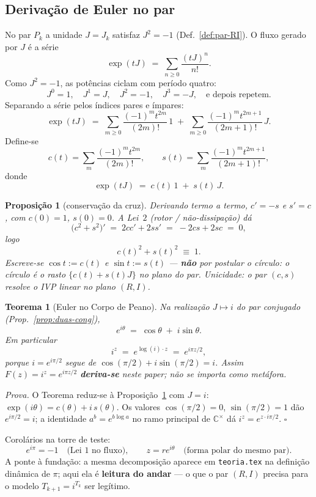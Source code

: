 \documentclass[11pt,a4paper]{article}
\newtheorem{teorema}{Teorema}
\newtheorem{proposicao}{Proposição}
\newcommand{\code}[1]{\texttt{#1}}
\begin{document}
\subsection*{Derivação de Euler no par}\label{sec:euler-peano}

No par $P_k$ a unidade $J=J_k$ satisfaz $J^{2}=-1$
(Def.~\ref{def:par-RI}). O fluxo gerado por $J$ é a série
\[
\boxed{
\exp(tJ)
\;=\;
\sum_{n\geq0}\frac{(tJ)^{n}}{n!}.
}
\]
Como $J^{2}=-1$, as potências ciclam com período quatro:
\[
\boxed{
J^{0}=1,\quad
J^{1}=J,\quad
J^{2}=-1,\quad
J^{3}=-J,
\quad\text{e depois repetem}.
}
\]
Separando a série pelos índices pares e ímpares:
\[
\exp(tJ)
\;=\;
\sum_{m\geq0}\frac{(-1)^{m}t^{2m}}{(2m)!}\,1
\;+\;
\sum_{m\geq0}\frac{(-1)^{m}t^{2m+1}}{(2m+1)!}\,J.
\]
Define-se
\[
\boxed{
c(t)=\sum_{m}\frac{(-1)^{m}t^{2m}}{(2m)!},
\qquad
s(t)=\sum_{m}\frac{(-1)^{m}t^{2m+1}}{(2m+1)!},
}
\]
donde
\[
\boxed{\exp(tJ) \;=\; c(t)\,1 \;+\; s(t)\,J}.
\]

\begin{proposicao}[conservação da cruz]\label{prop:euler-cruz}
Derivando termo a termo, $c'=-s$ e $s'=c$, com $c(0)=1$, $s(0)=0$.
A Lei~$2$ (rotor / não-dissipação) dá
\[
\bigl(c^{2}+s^{2}\bigr)'
\;=\;
2cc'+2ss'
\;=\;
-2cs+2sc
\;=\;
0,
\]
logo
\[
\boxed{c(t)^{2}+s(t)^{2}\;\equiv\;1}.
\]
Escreve-se $\cos t:=c(t)$ e $\sin t:=s(t)$ --- \textbf{não} por
postular o círculo: o círculo é o rasto $\{c(t)+s(t)J\}$ no plano do
par. Unicidade: o par $(c,s)$ resolve o IVP linear no plano $(R,I)$.
\end{proposicao}

\begin{teorema}[Euler no Corpo de Peano]\label{thm:euler-peano}
Na realização $J\mapsto i$ do par conjugado
(Prop.~\ref{prop:duas-cong}),
\[
\boxed{e^{i\theta} \;=\; \cos\theta \;+\; i\sin\theta}.
\]
Em particular
\[
\boxed{i^{z} \;=\; e^{\log(i)\cdot z} \;=\; e^{i\pi z/2}},
\]
porque $i=e^{i\pi/2}$ segue de $\cos(\pi/2)+i\sin(\pi/2)=i$.
Assim $F(z)=i^{z}=e^{i\pi z/2}$ \textbf{deriva-se} neste paper; não
se importa como metáfora.
\end{teorema}

\emph{Prova.} O Teorema reduz-se à Proposição~\ref{prop:euler-cruz}
com $J=i$: $\exp(i\theta)=c(\theta)+i\,s(\theta)$. Os valores
$\cos(\pi/2)=0$, $\sin(\pi/2)=1$ dão $e^{i\pi/2}=i$; a identidade
$a^{b}=e^{b\log a}$ no ramo principal de $\mathbb{C}^{\times}$ dá
$i^{z}=e^{z\cdot i\pi/2}$. $\square$

\noindent Corolários na torre de teste:
\[
\boxed{e^{i\pi}=-1}
\quad\text{(Lei~$1$ no fluxo)},
\qquad
\boxed{z=r e^{i\theta}}
\quad\text{(forma polar do mesmo par)}.
\]
A ponte à fundação: a mesma decomposição aparece em
\code{teoria.tex} na definição dinâmica de $\pi$; aqui ela é
\textbf{leitura do andar} --- o que o par $(R,I)$ precisa para o
modelo $T_{k+1}=i^{T_k}$ ser legítimo.
\end{document}
